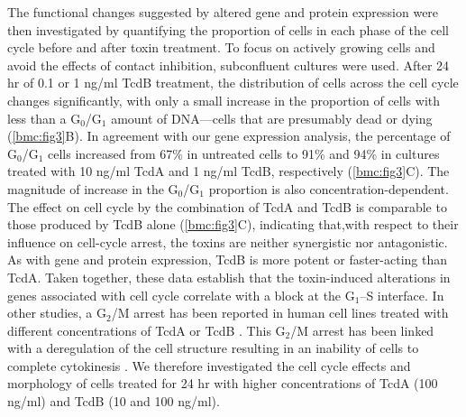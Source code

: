The functional changes suggested by altered gene and protein 
expression were then investigated by quantifying the proportion 
of cells in each phase of the cell cycle before and after 
toxin treatment. To focus on actively growing cells and 
avoid the effects of contact inhibition, subconfluent 
cultures were used. After 24 hr of 0.1 or 1 ng/ml TcdB 
treatment, the distribution of cells across the cell 
cycle changes significantly, with only a small increase 
in the proportion of cells with less than a 
G$_{\text{0}}$/G$_{\text{1}}$ amount of DNA—cells 
that are presumably dead or dying (\autoref{bmc:fig3}B). 
In agreement with our gene expression analysis, the 
percentage of G$_{\text{0}}$/G$_{\text{1}}$ cells increased 
from 67\% in untreated cells to 91\% and 94\% in cultures 
treated with 10 ng/ml TcdA and 1 ng/ml TcdB, 
respectively (\autoref{bmc:fig3}C). The magnitude of 
increase in the G$_{\text{0}}$/G$_{\text{1}}$ proportion 
is also concentration-dependent. The effect on cell cycle 
by the combination of TcdA and TcdB is comparable to 
those produced by TcdB alone (\autoref{bmc:fig3}C), 
indicating that,with respect to their influence on cell-cycle 
arrest, the toxins are neither synergistic nor antagonistic. 
As with gene and protein expression, TcdB is more potent or 
faster-acting than TcdA. Taken together, these data 
establish that the toxin-induced alterations in genes 
associated with cell cycle correlate with a block at 
the G$_{\text{1}}$–S interface. In other studies, a 
G$_{\text{2}}$/M arrest has been reported in human cell 
lines treated with different concentrations of TcdA 
or TcdB \cite{Kim:2005jk, Gerhard:2008wz, Nottrott:2007ep}. 
This G$_{\text{2}}$/M arrest has been linked with a 
deregulation of the cell structure resulting in an 
inability of cells to complete cytokinesis 
\cite{Huelsenbeck:2009di}. We therefore investigated 
the cell cycle effects and morphology of cells treated 
for 24 hr with higher concentrations of TcdA (100 ng/ml) 
and TcdB (10 and 100 ng/ml).

